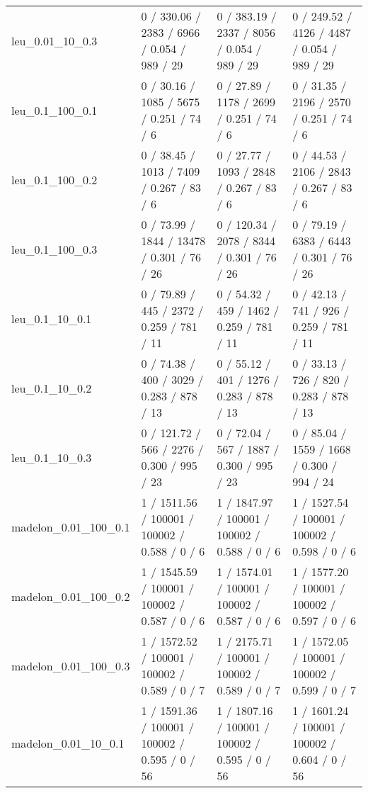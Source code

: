 \begin{tabular}{llll}
           leu\_0.01\_10\_0.3 &    0 / 330.06 /   2383 /    6966 / 0.054 /    989 /     29 &    0 / 383.19 /   2337 /    8056 / 0.054 /    989 /     29 &    0 / 249.52 /   4126 /    4487 / 0.054 /    989 /     29 \\
           leu\_0.1\_100\_0.1 &     0 / 30.16 /   1085 /    5675 / 0.251 /     74 /      6 &     0 / 27.89 /   1178 /    2699 / 0.251 /     74 /      6 &     0 / 31.35 /   2196 /    2570 / 0.251 /     74 /      6 \\
           leu\_0.1\_100\_0.2 &     0 / 38.45 /   1013 /    7409 / 0.267 /     83 /      6 &     0 / 27.77 /   1093 /    2848 / 0.267 /     83 /      6 &     0 / 44.53 /   2106 /    2843 / 0.267 /     83 /      6 \\
           leu\_0.1\_100\_0.3 &     0 / 73.99 /   1844 /   13478 / 0.301 /     76 /     26 &    0 / 120.34 /   2078 /    8344 / 0.301 /     76 /     26 &     0 / 79.19 /   6383 /    6443 / 0.301 /     76 /     26 \\
            leu\_0.1\_10\_0.1 &     0 / 79.89 /    445 /    2372 / 0.259 /    781 /     11 &     0 / 54.32 /    459 /    1462 / 0.259 /    781 /     11 &     0 / 42.13 /    741 /     926 / 0.259 /    781 /     11 \\
            leu\_0.1\_10\_0.2 &     0 / 74.38 /    400 /    3029 / 0.283 /    878 /     13 &     0 / 55.12 /    401 /    1276 / 0.283 /    878 /     13 &     0 / 33.13 /    726 /     820 / 0.283 /    878 /     13 \\
            leu\_0.1\_10\_0.3 &    0 / 121.72 /    566 /    2276 / 0.300 /    995 /     23 &     0 / 72.04 /    567 /    1887 / 0.300 /    995 /     23 &     0 / 85.04 /   1559 /    1668 / 0.300 /    994 /     24 \\
      madelon\_0.01\_100\_0.1 &   1 / 1511.56 / 100001 /  100002 / 0.588 /      0 /      6 &   1 / 1847.97 / 100001 /  100002 / 0.588 /      0 /      6 &   1 / 1527.54 / 100001 /  100002 / 0.598 /      0 /      6 \\
      madelon\_0.01\_100\_0.2 &   1 / 1545.59 / 100001 /  100002 / 0.587 /      0 /      6 &   1 / 1574.01 / 100001 /  100002 / 0.587 /      0 /      6 &   1 / 1577.20 / 100001 /  100002 / 0.597 /      0 /      6 \\
      madelon\_0.01\_100\_0.3 &   1 / 1572.52 / 100001 /  100002 / 0.589 /      0 /      7 &   1 / 2175.71 / 100001 /  100002 / 0.589 /      0 /      7 &   1 / 1572.05 / 100001 /  100002 / 0.599 /      0 /      7 \\
       madelon\_0.01\_10\_0.1 &   1 / 1591.36 / 100001 /  100002 / 0.595 /      0 /     56 &   1 / 1807.16 / 100001 /  100002 / 0.595 /      0 /     56 &   1 / 1601.24 / 100001 /  100002 / 0.604 /      0 /     56 \\

\end{tabular}
